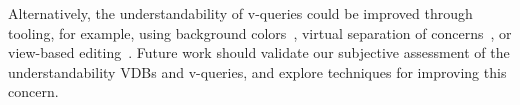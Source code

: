 Alternatively, the understandability of v-queries could be improved through
tooling, for example, using background colors~\cite{feigenspan2013}, virtual
separation of concerns~\cite{KA09}, or view-based
editing~\cite{WO14gpce,SBWW16icsme}.
%
Future work should validate our subjective assessment of the understandability
VDBs and v-queries, and explore techniques for improving this concern.



